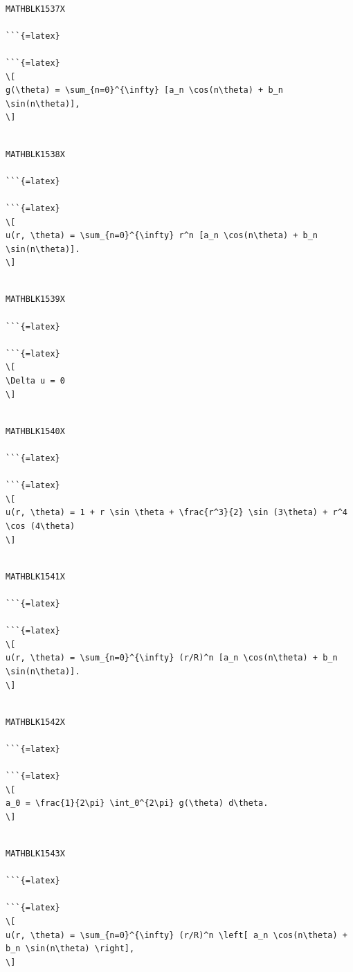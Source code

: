 \documentclass[
]{article}
\begin{document}
\begin{verbatim}

MATHBLK1537X

```{=latex}

```{=latex}
\[
g(\theta) = \sum_{n=0}^{\infty} [a_n \cos(n\theta) + b_n \sin(n\theta)],
\]
\end{verbatim}

\begin{verbatim}

MATHBLK1538X

```{=latex}

```{=latex}
\[
u(r, \theta) = \sum_{n=0}^{\infty} r^n [a_n \cos(n\theta) + b_n \sin(n\theta)].
\]
\end{verbatim}

\begin{verbatim}

MATHBLK1539X

```{=latex}

```{=latex}
\[
\Delta u = 0
\]
\end{verbatim}

\begin{verbatim}

MATHBLK1540X

```{=latex}

```{=latex}
\[
u(r, \theta) = 1 + r \sin \theta + \frac{r^3}{2} \sin (3\theta) + r^4 \cos (4\theta)
\]
\end{verbatim}

\begin{verbatim}

MATHBLK1541X

```{=latex}

```{=latex}
\[
u(r, \theta) = \sum_{n=0}^{\infty} (r/R)^n [a_n \cos(n\theta) + b_n \sin(n\theta)].
\]
\end{verbatim}

\begin{verbatim}

MATHBLK1542X

```{=latex}

```{=latex}
\[
a_0 = \frac{1}{2\pi} \int_0^{2\pi} g(\theta) d\theta.
\]
\end{verbatim}

\begin{verbatim}

MATHBLK1543X

```{=latex}

```{=latex}
\[
u(r, \theta) = \sum_{n=0}^{\infty} (r/R)^n \left[ a_n \cos(n\theta) + b_n \sin(n\theta) \right],
\]
\end{verbatim}
\end{document}
